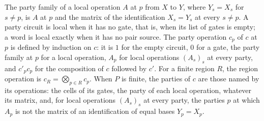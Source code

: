 \begin{definition}
    \label{def:party_local_circuit}
    \leanok
    The party family of a local operation $A$ at $p$ from $X$ to $Y$, where
    $Y_s=X_s$ for $s\neq p$, is $A$ at $p$ and the matrix of the identification
    $X_s=Y_s$ at every $s\neq p$. A party circuit is local when it has no gate,
    that is, when its list of gates is empty; a word is local exactly when it has
    no pair source. The party operation $c_p$ of $c$ at $p$ is defined by induction
    on $c$: it is $1$ for the empty circuit, $0$ for a gate, the party family at $p$
    for a local operation, $A_p$ for local operations $(A_s)_s$ at every party, and
    $c'_pc_p$ for the composition of $c$ followed by $c'$. For a finite region $R$,
    the region operation is $c_R=\bigotimes_{p\in R}c_p$. When $P$ is finite, the
    parties of $c$ are those named by its operations: the cells of its gates, the
    party of each local operation, whatever its matrix, and, for local operations
    $(A_s)_s$ at every party, the parties $p$ at which $A_p$ is not the matrix of an
    identification of equal bases $Y_p=X_p$.
\end{definition}


